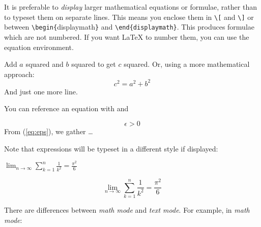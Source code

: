 It is preferable to \emph{display} larger mathematical equations or formulae,
rather than to typeset them on separate lines. This means you enclose them
in \verb|\[|  and \verb|\]|  or between
\verb|\begin{|displaymath\verb|}| and
  \verb|\end{displaymath}|.  This produces formulae which are not
numbered. If you want \LaTeX{} to number them, you can use the
equation environment.


\begin{singlespace}
\begin{example}
Add $a$ squared and $b$ squared 
to get $c$ squared. Or, using 
a more mathematical approach:
\begin{displaymath}
c^{2}=a^{2}+b^{2}
\end{displaymath}
And just one more line.
\end{example}
\end{singlespace}

You can reference an equation with  and 

\begin{singlespace}
\begin{example}
\begin{equation} \label{eq:eps}
\epsilon > 0
\end{equation}
From (\ref{eq:eps}), we gather 
\ldots
\end{example}
\end{singlespace}

Note that expressions will be typeset in a different style if displayed:

\begin{singlespace}
\begin{example}
$\lim_{n \to \infty} 
\sum_{k=1}^n \frac{1}{k^2} 
= \frac{\pi^2}{6}$
\end{example}
\end{singlespace}
\begin{singlespace}
\begin{example}
\begin{displaymath}
\lim_{n \to \infty} 
\sum_{k=1}^n \frac{1}{k^2} 
= \frac{\pi^2}{6}
\end{displaymath}
\end{example}
\end{singlespace}

There are differences between \emph{math mode} and \emph{text mode}. For
example, in \emph{math mode}: 

